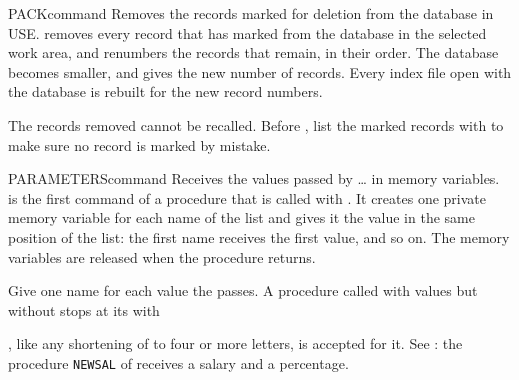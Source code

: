 \begin{XbaseEntry}{PACK}{command}
Removes the records marked for deletion from the database in USE.
\Syntax
{}
\Usage
{} removes every record that  has marked from the database
in the selected work area, and renumbers the records that remain, in their
order.  The database becomes smaller, and  gives the new
number of records.  Every index file open with the database is rebuilt for the
new record numbers.

The records removed cannot be recalled.
\Tips
Before , list the marked records with  to make
sure no record is marked by mistake.
\Examples
{}
\end{XbaseEntry}

\begin{XbaseEntry}{PARAMETERS}{command}
Receives the values passed by  \ldots{}  in memory variables.
\Syntax
{}
\Usage
{} is the first command of a procedure that is called with
.  It creates one private memory variable for each name of the list
and gives it the value in the same position of the  list: the first
name receives the first value, and so on.  The memory variables are released
when the procedure returns.

Give  one name for each value the  passes.  A procedure
called with values but without  stops at its  with

, like any shortening of  to four or more
letters, is accepted for it.
\Examples
See : the procedure \texttt{NEWSAL} of  receives a salary
and a percentage.
\end{XbaseEntry}

